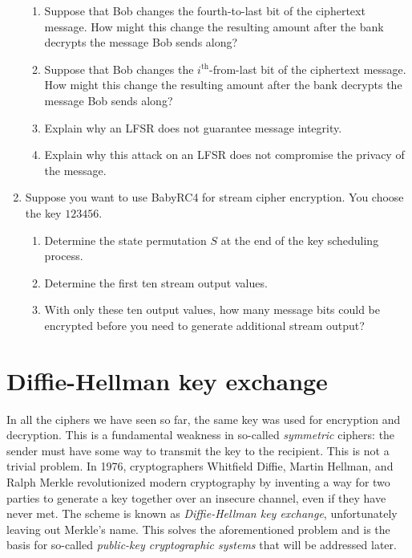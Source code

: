 \documentclass{book}
\theoremstyle{plain}
\theoremstyle{definition}
\newif\ifprintsolutions
\newcommand{\solution}[1]{\ifprintsolutions \begin{sloppypar}{\it #1}\end{sloppypar} \fi} %
\begin{document}
\begin{enumerate}
\begin{enumerate}
\item Suppose that Bob changes the fourth-to-last bit of the ciphertext message. How might this change the resulting amount after the bank decrypts the message Bob sends along? \solution{The amount will either increase or decrease by eight dollars, depending on the original bit and the corresponding key bit.}
\item Suppose that Bob changes the $i^{\text{th}}$-from-last bit of the ciphertext message. How might this change the resulting amount after the bank decrypts the message Bob sends along? \solution{The amount will either increase or decrease by $2^{i-1}$ dollars, depending on the original bit and the corresponding key bit.}
\item Explain why an LFSR does not guarantee message integrity. \solution{Bob can change bits in a way that affects the plaintext message. The bank has no way of knowing that Alice did not send the altered message.}
\item Explain why this attack on an LFSR does not compromise the privacy of the message. \solution{Bob does not know how his changes will affect the plaintext message.}
\end{enumerate}
\item Suppose you want to use BabyRC4 for stream cipher encryption. You choose the key $123456$.
\begin{enumerate}
\item Determine the state permutation $S$ at the end of the key scheduling process. \solution{$S = 20167345$}
\item Determine the first ten stream output values. \solution{$1655466144$}
\item With only these ten output values, how many message bits could be encrypted before you need to generate additional stream output? \solution{You could encrypt $3 \times 10 = 30$ message bits.}
\end{enumerate}
\end{enumerate}

\chapter{Diffie-Hellman key exchange}
In all the ciphers we have seen so far, the same key was used for encryption and decryption. This is a fundamental weakness in so-called {\it symmetric} ciphers: the sender must have some way to transmit the key to the recipient. This is not a trivial problem. In 1976, cryptographers Whitfield Diffie, Martin Hellman, and Ralph Merkle revolutionized modern cryptography by inventing a way for two parties to generate a key together over an insecure channel, even if they have never met. The scheme is known as {\it Diffie-Hellman key exchange}, unfortunately leaving out Merkle's name. This solves the aforementioned problem and is the basis for so-called {\it public-key cryptographic systems} that will be addressed later.
\end{document}
